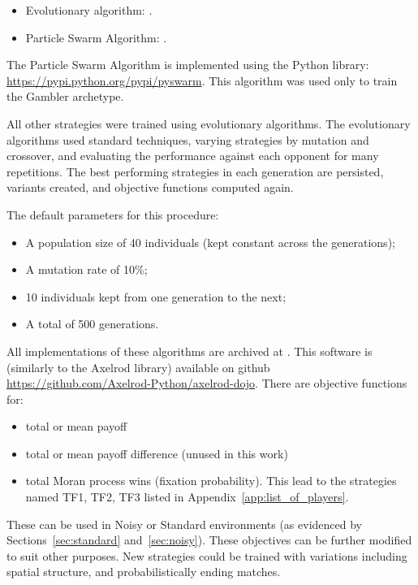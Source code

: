 \documentclass{article}
\begin{document}
\begin{itemize}
    \item Evolutionary algorithm: \cite{moriarty1999evolutionary}.
    \item Particle Swarm Algorithm: \cite{imran2013overview}.
\end{itemize}

The Particle Swarm Algorithm is implemented using the Python library:
\url{https://pypi.python.org/pypi/pyswarm}. This algorithm was used only to
train the Gambler archetype.

All other strategies were trained using evolutionary algorithms. The
evolutionary algorithms used standard techniques, varying strategies by
mutation and crossover, and evaluating the performance against each opponent
for many repetitions. The best performing strategies in each generation are
persisted, variants created, and objective functions computed again.

The default parameters for this procedure:

\begin{itemize}
	\item A population size of 40 individuals (kept constant across the
        generations);
	\item A mutation rate of 10\%;
	\item 10 individuals kept from one generation to the next;
    \item A total of 500 generations.
\end{itemize}

All implementations of these algorithms are archived at
\cite{marc_harper_2017_824264}. This software is (similarly to the Axelrod
library) available on github
\url{https://github.com/Axelrod-Python/axelrod-dojo}.  There are objective
functions for:

\begin{itemize}
 \item total or mean payoff
 \item total or mean payoff difference (unused in this work)
 \item total Moran process wins (fixation probability). This lead to the
     strategies named TF1, TF2, TF3 listed in
     Appendix~\ref{app:list_of_players}.
\end{itemize}

These can be used in Noisy or Standard environments (as evidenced by
Sections~\ref{sec:standard} and~\ref{sec:noisy}). These objectives can be
further modified to suit other purposes. New strategies could be trained with
variations including spatial structure, and probabilistically ending matches.
\end{document}
